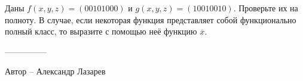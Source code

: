 \question
Даны $f(x, y, z) = (00101000)$ и $g(x, y, z) = (10010010)$. Проверьте их на полноту. В случае, если некоторая функция представляет собой функционально полный класс, то выразите с помощью неё функцию $\overline{x}$.

---------------

Автор -- Александр Лазарев